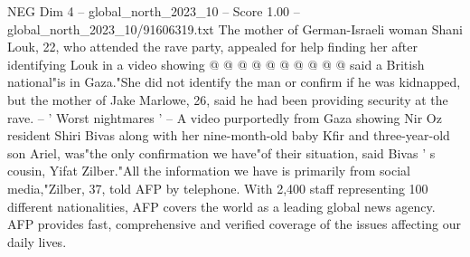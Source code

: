\begin{textsample}{NEG Dim 4 – global\_north\_2023\_10 – Score 1.00 – global\_north\_2023\_10/91606319.txt}
The mother of German-Israeli woman Shani Louk, 22, who attended the rave party, appealed for help finding her after identifying Louk in a video showing @ @ @ @ @ @ @ @ @ @ said a British national"is in Gaza."She did not identify the man or confirm if he was kidnapped, but the mother of Jake Marlowe, 26, said he had been providing security at the rave. -- ' Worst nightmares ' -- A video purportedly from Gaza showing Nir Oz resident Shiri Bivas along with her nine-month-old baby Kfir and three-year-old son Ariel, was"the only confirmation we have"of their situation, said Bivas ' s cousin, Yifat Zilber."All the information we have is primarily from social media,"Zilber, 37, told AFP by telephone.
With 2,400 staff representing 100 different nationalities, AFP covers the world as a leading global news agency.
AFP provides fast, comprehensive and verified coverage of the issues affecting our daily lives.

\end{textsample}

